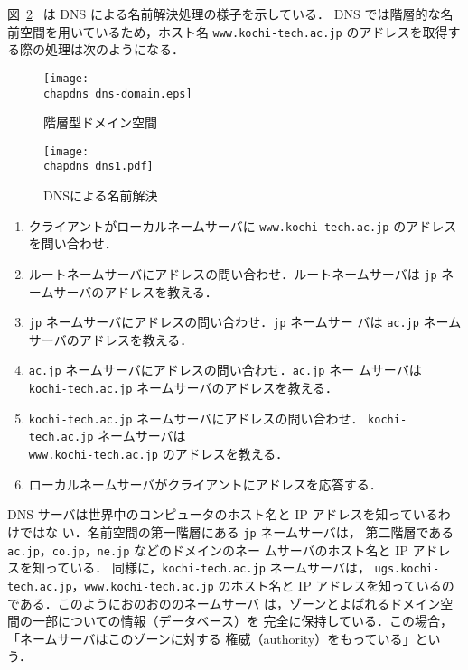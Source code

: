 図~\ref{fig:05:dns-dns}~ は DNS による名前解決処理の様子を示している．
DNS では階層的な名前空間を用いているため，ホスト名 
\verb|www.kochi-tech.ac.jp| のアドレスを取得する際の処理は次のようになる．

\begin{figure}[ht]
  \begin{center}
   \texttt{[image: \\chapdns dns-domain.eps]}
   \vspace*{1zh}
   \caption{階層型ドメイン空間}
   \label{fig:05:dns-domain}
  \end{center}
 \end{figure}

 \begin{figure}[ht]
   \begin{center}
    \texttt{[image: \\chapdns dns1.pdf]}
    \vspace*{1zh}
    \caption{DNSによる名前解決}
    \label{fig:05:dns-dns}
   \end{center}
  \end{figure}
  
  \begin{enumerate}
   \item クライアントがローカルネームサーバに %
         \verb|www.kochi-tech.ac.jp| のアドレスを問い合わせ．
   \item ルートネームサーバにアドレスの問い合わせ．ルートネームサーバは %
         \verb|jp| ネームサーバのアドレスを教える．
   \item \verb|jp| ネームサーバにアドレスの問い合わせ．\verb|jp| ネームサー
         バは \verb|ac.jp| ネームサーバのアドレスを教える．
   \item \verb|ac.jp| ネームサーバにアドレスの問い合わせ．\verb|ac.jp| ネー
         ムサーバは \verb|kochi-tech.ac.jp| ネームサーバのアドレスを教える．
   \item \verb|kochi-tech.ac.jp| ネームサーバにアドレスの問い合わせ．%
         \verb|kochi-tech.ac.jp| ネームサーバは\\
         \verb|www.kochi-tech.ac.jp| のアドレスを教える．
   \item ローカルネームサーバがクライアントにアドレスを応答する．
  \end{enumerate}
  
DNS サーバは世界中のコンピュータのホスト名と IP アドレスを知っているわけではな
い．名前空間の第一階層にある \verb|jp| ネームサーバは，
第二階層である \verb|ac.jp|，\verb|co.jp|，\verb|ne.jp| などのドメインのネー
ムサーバのホスト名と IP アドレスを知っている．
同様に，\verb|kochi-tech.ac.jp| ネームサーバは，
\verb|ugs.kochi-tech.ac.jp|，\verb|www.kochi-tech.ac.jp| のホスト名と IP %
アドレスを知っているのである．このようにおのおののネームサーバ
は，ゾーンとよばれるドメイン空間の一部についての情報（データベース）を
完全に保持している．この場合，「ネームサーバはこのゾーンに対する
権威（authority）をもっている」という．

